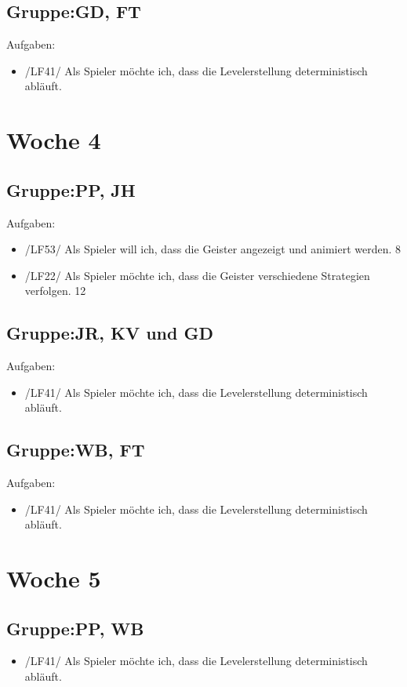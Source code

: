 \documentclass[11pt,a4paper]{article}
\begin{document}
\subsection*{Gruppe:GD, FT}
Aufgaben:
\begin{itemize}
\item /LF41/ Als Spieler möchte ich, dass die Levelerstellung deterministisch abläuft. 
\end{itemize}



\section*{Woche 4}

\subsection*{Gruppe:PP, JH}
Aufgaben:
\begin{itemize}
\item /LF53/ Als Spieler will ich, dass die Geister angezeigt und animiert werden. 8
\item /LF22/ Als Spieler möchte ich, dass die Geister verschiedene Strategien verfolgen. 12
\end{itemize}
\subsection*{Gruppe:JR, KV und GD}
Aufgaben:
\begin{itemize}
\item /LF41/ Als Spieler möchte ich, dass die Levelerstellung deterministisch abläuft.
\end{itemize}

\subsection*{Gruppe:WB, FT}
Aufgaben:
\begin{itemize}
\item /LF41/ Als Spieler möchte ich, dass die Levelerstellung deterministisch abläuft.
\end{itemize}
\section*{Woche 5}

\subsection*{Gruppe:PP, WB}
\begin{itemize}
\item /LF41/ Als Spieler möchte ich, dass die Levelerstellung deterministisch abläuft.
\end{itemize}
\end{document}
